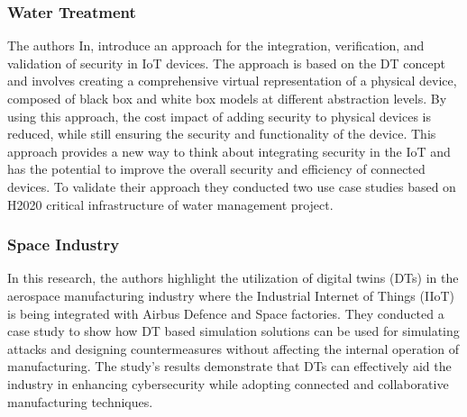 \subsubsection*{Water Treatment}

The authors In\cite{maillet-contozEndtoendSecurityValidation2020}, introduce an approach for the integration, verification, and validation of security in IoT devices. The approach is based on the DT concept and involves creating a comprehensive virtual representation of a physical device, composed of black box and white box models at different abstraction levels. By using this approach, the cost impact of adding security to physical devices is reduced, while still ensuring the security and functionality of the device. This approach provides a new way to think about integrating security in the IoT and has the potential to improve the overall security and efficiency of connected devices. To validate their approach they conducted two use case studies based on H2020 critical infrastructure of water management project.

\subsubsection*{Space Industry}

In \cite{adrienbacueDigitalTwinsEnhanced2022} this research, the authors highlight the utilization of digital twins (DTs) in the aerospace manufacturing industry where the Industrial Internet of Things (IIoT) is being integrated with Airbus Defence and Space factories. They conducted a case study to show how DT based simulation solutions can be used for simulating attacks and designing countermeasures without affecting the internal operation of manufacturing. The study's results demonstrate that DTs can effectively aid the industry in enhancing cybersecurity while adopting connected and collaborative manufacturing techniques.

